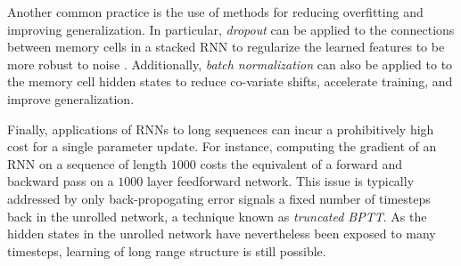 Another common practice is the use of methods for reducing overfitting and
improving generalization. In particular, \emph{dropout}
\citep{srivastava2014dropout} can be applied to the connections between memory
cells in a stacked RNN to regularize the learned features to be more robust to
noise \citep{zaremba2014recurrent}. Additionally, \emph{batch
normalization}\citep{ioffe2015batch} can also be applied to to the memory cell
hidden states to reduce co-variate shifts, accelerate training, and improve
generalization.

Finally, applications of RNNs to long sequences can incur a prohibitively high
cost for a single parameter update\citep{citeulike:13881859}. For instance,
computing the gradient of an RNN on a sequence of length $1000$ costs the
equivalent of a forward and backward pass on a $1000$ layer feedforward
network. This issue is typically addressed by only back-propogating error
signals a fixed number of timesteps back in the unrolled network, a technique
known as \emph{truncated BPTT}\citep{williams1990efficient}. As the hidden
states in the unrolled network have nevertheless been exposed to many timesteps,
learning of long range structure is still possible.
